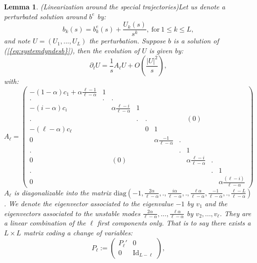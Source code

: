 \documentclass[11pt,a4paper,reqno]{amsart}
\newtheorem{lemma}[theorem]{Lemma}
\theoremstyle{remark}
\numberwithin{equation}{section}
\begin{document}
\begin{lemma}(Linearization around the special trajectories)\label{lem:linearisationsystemdyn}
Let us denote a perturbated solution around $b^e$ by:
\begin{equation}
b_k(s)=b^e_k(s)+\frac{U_k(s)}{s^k}, \ \text{for} \ 1\leq k\leq L ,
\end{equation}
and note $U=(U_1,...,U_L)$ the perturbation. Suppose $b$ is a solution of {{\rm (\ref{{eq:systemdyndesb}})}}, then the evolution of $U$ is given by:
\begin{equation}
\partial_t U=\frac{1}{s}A_{\ell}U +O\left( \frac{|U|^2}{s}\right) ,
\end{equation}
with:
\begin{equation}
A_{\ell}=\begin{pmatrix} -(1-\alpha)c_1 +\alpha \frac{\ell-1}{\ell-\alpha} & 1 &  & & & & & & &  \\ . & . & . & & & & & & &  \\ -(i-\alpha)c_i & & \alpha\frac{\ell-i}{\ell-\alpha} & 1 & & & & & &  \\ . &  & & . &. & & & (0)& &  \\ -(\ell-\alpha)c_{\ell} & & & & 0 & 1 & & & &  \\ 0 & & & & & \alpha\frac{-1}{\ell-\alpha} & . & & &  \\  . & & & & & & . & 1 & &  \\ 0 & & (0) & & & & & \alpha\frac{\ell-i}{\ell-\alpha} &. &  \\ . & & & & & & & &  . & 1  \\ 0 & & & & & & & & & \alpha \frac{(\ell-i)}{\ell-\alpha}   \end{pmatrix}
\end{equation}
$A_{\ell}$ is diagonalizable into the matrix $\text{diag}(-1, \frac{2\alpha}{\ell-\alpha},.,\frac{i\alpha}{\ell-\alpha},., \frac{\ell\alpha}{\ell-\alpha},\frac{-1}{\ell-\alpha},.,\frac{\ell-L}{\ell-\alpha})$. We denote the eigenvector associated to the eigenvalue $-1$ by $v_1$ and the eigenvectors associated to the unstable modes $\frac{2\alpha}{\ell-\alpha},...,\frac{\ell \alpha}{\ell-\alpha}$ by $v_2,...,v_{\ell}$. They are a linear combination of the $\ell$ first components only. That is to say there exists a $L\times L$ matrix coding a change of variables:
\begin{equation} \label{linearized:eq:def P}
P_{\ell}:=\begin{pmatrix} P_{\ell}' & 0 \\ 0 & \text{Id}_{L-\ell} \end{pmatrix},

\end{equation}
\end{lemma}
\end{document}
